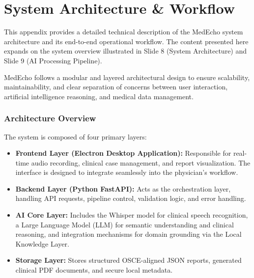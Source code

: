 \documentclass[12pt,a4paper]{report}
\begin{document}




\newpage
{}
\label{chapter:References}
\renewcommand{\bibname}{References}

\appendix
\chapter{System Architecture \& Workflow}\label{appendix:systema}


This appendix provides a detailed technical description of the MedEcho system architecture and its end-to-end operational workflow. The content presented here expands on the system overview illustrated in Slide 8 (System Architecture) and Slide 9 (AI Processing Pipeline).

MedEcho follows a modular and layered architectural design to ensure scalability, maintainability, and clear separation of concerns between user interaction, artificial intelligence reasoning, and medical data management.

\subsection{Architecture Overview}

The system is composed of four primary layers:

\begin{itemize}
    \item \textbf{Frontend Layer (Electron Desktop Application):}  
    Responsible for real-time audio recording, clinical case management, and report visualization. The interface is designed to integrate seamlessly into the physician's workflow.

    \item \textbf{Backend Layer (Python FastAPI):}  
    Acts as the orchestration layer, handling API requests, pipeline control, validation logic, and error handling.

    \item \textbf{AI Core Layer:}  
    Includes the Whisper model for clinical speech recognition, a Large Language Model (LLM) for semantic understanding and clinical reasoning, and integration mechanisms for domain grounding via the Local Knowledge Layer.

    \item \textbf{Storage Layer:}  
    Stores structured OSCE-aligned JSON reports, generated clinical PDF documents, and secure local metadata.
\end{itemize}
\end{document}

